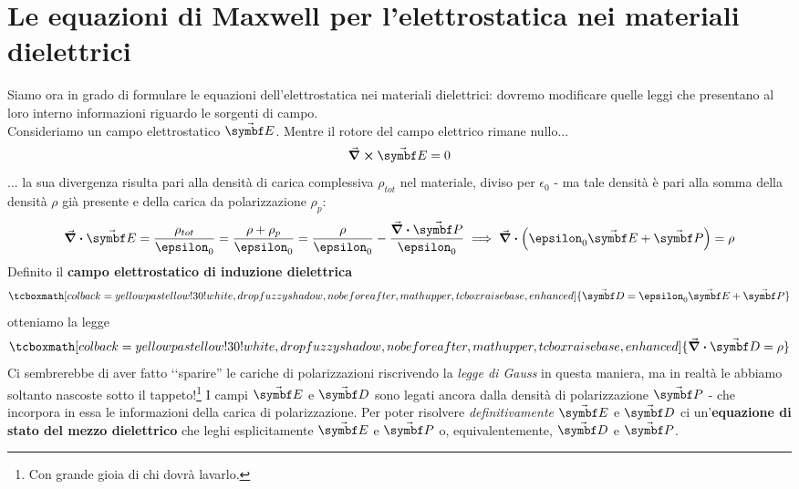 \section{Le equazioni di Maxwell per l'elettrostatica nei materiali dielettrici}\label{EqMaxwellDielettrici}
Siamo ora in grado di formulare le equazioni dell'elettrostatica nei materiali dielettrici: dovremo modificare quelle leggi che presentano al loro interno informazioni riguardo le sorgenti di campo.\\
Consideriamo un campo elettrostatico $\vba{E}$. Mentre il rotore del campo elettrico rimane nullo...
\begin{equation}
	\curl{\vba{E}}=0
\end{equation}
... la sua divergenza risulta pari alla densità di carica complessiva $\rho_{tot}$ nel materiale, diviso per $\epsilon_0$ - ma tale densità è pari alla somma della densità $\rho$ già presente e della carica da polarizzazione $\rho_p$:
\begin{equation*}
	\div{\vba{E}}=\frac{\rho_{tot}}{\epsilon_0}=\frac{\rho+\rho_p}{\epsilon_0}=\frac{\rho}{\epsilon_0}-\frac{\div{\vba{P}}}{\epsilon_0}\implies \div{\left(\epsilon_0\vba{E}+\vba{P}\right)}=\rho
\end{equation*}
Definito il \textbf{campo elettrostatico di induzione dielettrica}
\begin{equation}
	\tcboxmath[colback=yellowpastellow!30!white,drop fuzzy shadow, nobeforeafter, math upper, tcbox raise base, enhanced]{\vba{D}=\epsilon_0\vba{E}+\vba{P}}
\end{equation}
otteniamo la legge
\begin{equation}
	\tcboxmath[colback=yellowpastellow!30!white,drop fuzzy shadow, nobeforeafter, math upper, tcbox raise base, enhanced]{\div{\vba{D}}=\rho}\label{SecondaMaxwellDIelettriciUno}
\end{equation}
Ci sembrerebbe di aver fatto ‘‘sparire'' le cariche di polarizzazioni riscrivendo la \textit{legge di Gauss} in questa maniera, ma in realtà le abbiamo soltanto nascoste sotto il tappeto!\footnote{Con grande gioia di chi dovrà lavarlo.} I campi $\vba{E}$ e $\vba{D}$ sono legati ancora dalla densità di polarizzazione $\vba{P}$ - che incorpora in essa le informazioni della carica di polarizzazione. Per poter risolvere \textit{definitivamente} $\vba{E}$ e $\vba{D}$ ci un'\textbf{equazione di stato del mezzo dielettrico} che leghi esplicitamente $\vba{E}$ e $\vba{P}$ o, equivalentemente, $\vba{D}$ e $\vba{P}$.\\
